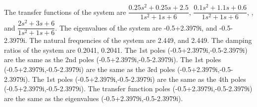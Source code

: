 The transfer functions of the system are $\dfrac{0.25s^2+0.25s+2.5}{1s^2+1s+6}$, $\dfrac{0.1s^2+1.1s+0.6}{1s^2+1s+6}$, , and $\dfrac{2s^2+3s+6}{1s^2+1s+6}$. The eigenvalues of the system are -0.5+2.3979i, and -0.5-2.3979i. The natural frequencies of the system are 2.449, and 2.449. The damping ratios of the system are 0.2041, 0.2041. The 1st poles (-0.5+2.3979i,-0.5-2.3979i) are the same as the 2nd poles (-0.5+2.3979i,-0.5-2.3979i). The 1st poles (-0.5+2.3979i,-0.5-2.3979i) are the same as the 3rd poles (-0.5+2.3979i,-0.5-2.3979i). The 1st poles (-0.5+2.3979i,-0.5-2.3979i) are the same as the 4th poles (-0.5+2.3979i,-0.5-2.3979i). The transfer function poles (-0.5+2.3979i,-0.5-2.3979i) are the same as the eigenvalues (-0.5+2.3979i,-0.5-2.3979i). 